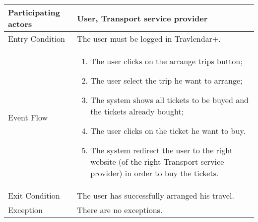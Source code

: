 \begin{table}[H]
	\begin{center}
		\begin{tabular}{ | p{} | p{} | }
		\hline
		Participating actors &  User, Transport service provider\\
		\hline
		Entry Condition & The user must be logged in Travlendar+.\\
		\hline
		Event Flow & 
			\begin{enumerate}
				\item The user clicks on the arrange trips button;
				\item The user select the trip he want to arrange;
				\item The system shows all tickets to be buyed and the tickets already bought;
				\item The user clicks on the ticket he want to buy.
				\item The system redirect the user to the right website (of the right Transport service provider) in order to buy the tickets.
			\end{enumerate} \\
		\hline
		Exit Condition & The user has successfully arranged his travel. \\
		\hline
		Exception & There are no exceptions. \\ 
		\hline
		\end{tabular}
	\end{center}
\end{table}